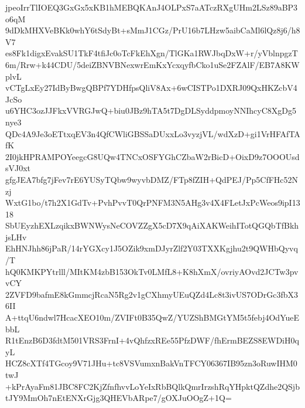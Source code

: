 jpeoIrrTlIOEQ3GxGx5xKB1hMEBQKAnJ4OLPxS7aATczRXgUHm2LSz89aBP3o6qM
9dDkMHXVeBKk0whY6tSdyBt+sMmJ1CGz/PrU16b7LHzw5aibCaMl6lQz8j6/h8V7
es8Fk1digxEvakSU1TkF4tfiJc0oTcFkEhXgn/TlGKa1RWJbqDxW+r/yVblnpgzT
6m/Rrw+k44CDU/5deiZBNVBNexwrEmKxYcxqyfbCko1uSe2FZAlF/EB7A8KWplvL
vCTgLxEy27IdByBwgQBPf7YDHfpsQliV8Ax+6wCISTPo1DXRJ09QxHKZcbV4JcSo
u6YHC3ozJJFkxVVRGJwQ+biu0JBz9hTA5t7DgDLSyddpmoyNNIhcyC8XgDg5nye3
QDc4A9Je3oETtxqEV3n4QfCWliGBSSaDUxxLo3vyzjVL/wdXzD+gi1VrHFAfTAfK
2I0jkHPRAMPOYeegcG8UQw4TNCxOSFYGhCZbaW2rBicD+OixD9z7OOOUsdsVJ0xt
gfgJEA7bfg7jFev7rE6YUSyTQbw9wyvbDMZ/FTp8fZIH+QdPEJ/Pp5CfFHc52Nzj
WxtG1bo/t7h2X1GdTv+PvhPvvT0QrPNFM3N5AHg3v4X4FLetJxPcWeos9ipI1318
SbUEyzhEXLzqikxBWNWysNeCOVZZgX5cD7X9qAiXAKWeihITotQGQbTfBkhjsLHv
EhHNJhh86jPaR/14rYGXcy1J5OZik9xmDJyrZlf2Y03TXXKgjhu2t9QWHbQyvq/T
hQ0KMKPYtrlll/MItKM4zbB153OkTv0LMfL8+K8hXmX/ovriyAOvd2JCTw3pvvCY
2ZVFD9bafmE8kGmmcjRcaN5Rg2v1gCXhmyUEuQZd4Lc8t3ivUS7ODrGc3fbX36II
A+ttqU6ndwl7HcacXEO10m/ZVIFt0B35QwZ/YUZShBMGtYM5t5febj4OdYueEbbL
R1tEnzB6D3fdtM501VRS3FrnI+4vQhfzxREe55PfzDWF/fhErmBEZS8EWDiH0qyL
HCZ8cXTf4TGcoy9V71JHu+tc8VSVumxnBakVnTFCY06367IB95zn3oRuwIHM0twJ
+kPrAyaFm81JBC8FC2KjZfnfhvvLoYeIxRbBQlkQmrIrzshRqYHpktQZdhe2QSjb
tJY9MmOh7nEtENXrGjg3QHEVbARpe7/gOXJuOOgZ+1Q=

